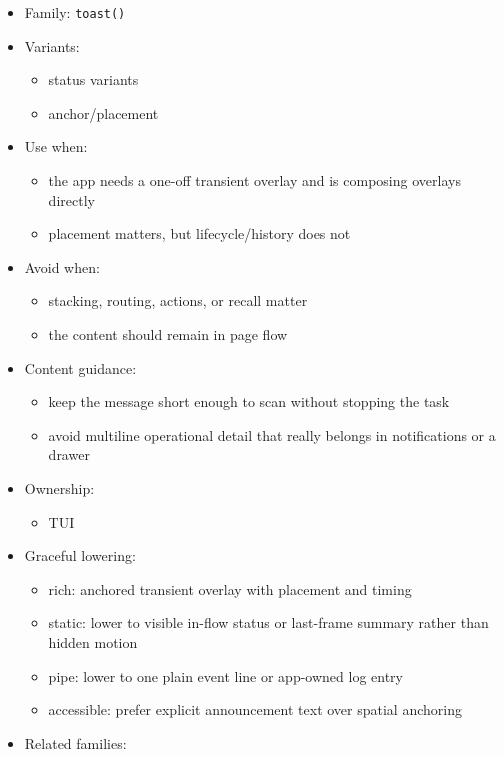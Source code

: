 \begin{itemize}
\tightlist
\item
  Family: \texttt{t\allowbreak{}o\allowbreak{}a\allowbreak{}s\allowbreak{}t\allowbreak{}(\allowbreak{})}
\item
  Variants:

  \begin{itemize}
  \tightlist
  \item
    status variants
  \item
    anchor/placement
  \end{itemize}
\item
  Use when:

  \begin{itemize}
  \tightlist
  \item
    the app needs a one-off transient overlay and is composing overlays directly
  \item
    placement matters, but lifecycle/history does not
  \end{itemize}
\item
  Avoid when:

  \begin{itemize}
  \tightlist
  \item
    stacking, routing, actions, or recall matter
  \item
    the content should remain in page flow
  \end{itemize}
\item
  Content guidance:

  \begin{itemize}
  \tightlist
  \item
    keep the message short enough to scan without stopping the task
  \item
    avoid multiline operational detail that really belongs in notifications or a drawer
  \end{itemize}
\item
  Ownership:

  \begin{itemize}
  \tightlist
  \item
    TUI
  \end{itemize}
\item
  Graceful lowering:

  \begin{itemize}
  \tightlist
  \item
    rich: anchored transient overlay with placement and timing
  \item
    static: lower to visible in-flow status or last-frame summary rather than hidden motion
  \item
    pipe: lower to one plain event line or app-owned log entry
  \item
    accessible: prefer explicit announcement text over spatial anchoring
  \end{itemize}
\item
  Related families:


\end{itemize}
